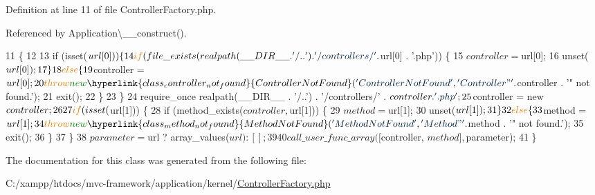 Definition at line 11 of file Controller\+Factory.\+php.



Referenced by Application\textbackslash{}\+\_\+\+\_\+construct().


\begin{DoxyCode}
11                                                                           \{
12 
13         \textcolor{keywordflow}{if} (isset($url[0])) \{
14             \textcolor{keywordflow}{if} (file\_exists(realpath(\_\_DIR\_\_ . \textcolor{stringliteral}{'/..'}) . \textcolor{stringliteral}{'/controllers/'} . $url[0] . \textcolor{stringliteral}{'.php'})) \{
15                 $controller = $url[0];
16                 unset($url[0]);
17             \}
18             \textcolor{keywordflow}{else} \{
19                 $controller = $url[0];
20                 \textcolor{keywordflow}{throw} \textcolor{keyword}{new} \hyperlink{class_controller_not_found}{ControllerNotFound}(\textcolor{stringliteral}{'ControllerNotFound'}, \textcolor{stringliteral}{'Controller "'} . 
      $controller . \textcolor{stringliteral}{'" not found.'});
21                 exit();
22             \}
23         \}
24         require\_once realpath(\_\_DIR\_\_ . \textcolor{stringliteral}{'/..'}) . \textcolor{stringliteral}{'/controllers/'} . $controller . \textcolor{stringliteral}{'.php'};
25         $controller = \textcolor{keyword}{new} $controller;
26 
27         \textcolor{keywordflow}{if} (isset($url[1])) \{
28             \textcolor{keywordflow}{if} (method\_exists($controller, $url[1])) \{
29                 $method = $url[1];
30                 unset($url[1]);
31             \}
32             \textcolor{keywordflow}{else} \{
33                 $method = $url[1];
34                 \textcolor{keywordflow}{throw} \textcolor{keyword}{new} \hyperlink{class_method_not_found}{MethodNotFound}(\textcolor{stringliteral}{'MethodNotFound'}, \textcolor{stringliteral}{'Method "'} . $method . \textcolor{stringliteral}{'" not
       found.'});
35                 exit();
36             \}
37         \}
38         $parameter = $url ? array\_values($url) : [];
39 
40         call\_user\_func\_array([$controller, $method], $parameter);
41     \}
\end{DoxyCode}


The documentation for this class was generated from the following file\+:\begin{DoxyCompactItemize}
\item 
C\+:/xampp/htdocs/mvc-\/framework/application/kernel/\hyperlink{_controller_factory_8php}{Controller\+Factory.\+php}\end{DoxyCompactItemize}
